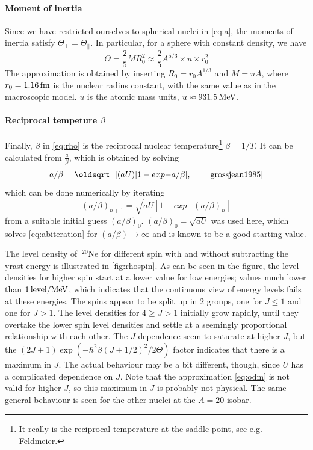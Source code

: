 \paragraph{Moment of inertia}
Since we have restricted ourselves to spherical nuclei in \eqref{eq:a}, the moments of inertia satisfy $\Theta_\perp = \Theta_\parallel$. In particular, for a sphere with constant density, we have
\begin{equation}
\Theta = \frac{2}{5} M R_0^2 \approx \frac{2}{5} A^{5/3}\times u \times r_0^2
\end{equation}
The approximation is obtained by inserting $R_0 = r_0 A^{1/3}$ and $M=u A$, where $r_0=\unit[1.16]{fm}$ is the nuclear radius constant, with the same value as in the macroscopic model\cite{moller1995}. $u$ is the atomic mass units, $u \approx \unit[931.5]{MeV}$.
\paragraph{Reciprocal tempeture $\beta$}
Finally, $\beta$ in \eqref{eq:rho} is the reciprocal nuclear temperature\footnote{It really is the reciprocal temperature at the saddle-point, see e.g. Feldmeier\cite{grossjean1985}.} $\beta=1/T$. It can be calculated from $\tfrac{a}{\beta}$, which is obtained by solving
\begin{equation}
a/\beta=\sqrt{(aU)[1 -exp{-a/\beta}]},\qquad\cite{grossjean1985}\label{eq:abiteration}
\end{equation}
which can be done numerically by iterating
\begin{equation}
(a/\beta)_{n+1}=\sqrt{aU[1 -exp{-(a/\beta)_n}]}
\end{equation}
from a suitable initial guess $(a/\beta)_{0}$. $(a/\beta)_{0}=\sqrt{aU}$ was used here, which solves \eqref{eq:abiteration} for $(a/\beta) \to \infty$ and is known to be a good starting value\cite{grossjean1985}.

\def\bredd{0.5}

The level density of $~^{20}\mathrm{Ne}$ for different spin with and without subtracting the yrast-energy is illustrated in \autoref{fig:rhospin}. 
As can be seen in the figure, the level densities for higher spin start at a lower value for low energies; values much lower than $\unit[1]{level/MeV}$, which indicates that the continuous view of energy levels fails at these energies. 
The spins appear to be split up in $2$ groups, one for $J \le 1$ and one for $J>1$.
The level densities for $4 \ge J> 1$ initially grow rapidly, until they overtake the lower spin level densities and settle at a seemingly proportional relationship with each other. The $J$ dependence seem to saturate at higher $J$, but the $(2J+1)\exp{(-\hbar^2\beta(J+1/2)^2/2\Theta)}$ factor indicates that there is a maximum in $J$. The actual behaviour may be a bit different, though, since $U$ has a complicated dependence on $J$.
Note that the approximation \eqref{eq:odm} is not valid for higher $J$, so this maximum in $J$ is probably not physical.
The same general behaviour is seen for the other nuclei at the $A=20$ isobar.

